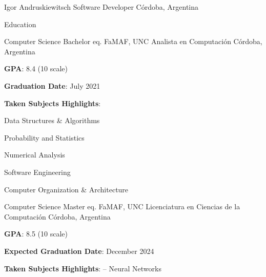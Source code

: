 \documentclass{curriculum}
\begin{document}

\begin{cvheader}

\makeheader
    {Igor Andruskiewitsch}  {}
    {Software Developer}    {}
    {Córdoba, Argentina}    {}

\end{cvheader}


\begin{cvsection}{Education}

    \makesectionitemheader
        {Computer Science Bachelor eq.}                             {FaMAF, UNC}
        {Analista en Computación}                           {Córdoba, Argentina}

        \begin{sectionitemlist}

        \item {
            \textbf{GPA}: 8.4 (10 scale)
        }
        \item {
            \textbf{Graduation Date}: July 2021
        }
        \item {
            \textbf{Taken Subjects Highlights}:
        }
        {
            \begin{colsectionitemlist}{3}
                \item{Data Structures \& Algorithms}
                \item{Probability and Statistics}
                \item{Numerical Analysis}
                \item{Software Engineering}
                \item{Computer Organization \& Architecture}
            \end{colsectionitemlist}
        }

        \end{sectionitemlist}

    \makesectionitemheader
        {Computer Science Master eq.}                               {FaMAF, UNC}
        {Licenciatura en Ciencias de la Computación}        {Córdoba, Argentina}

        \begin{sectionitemlist}

        \item {
            \textbf{GPA}: 8.5 (10 scale)
        }
        \item {
            \textbf{Expected Graduation Date}: December 2024
        }
        \item {
            \textbf{Taken Subjects Highlights}: – Neural Networks
        }

        \end{sectionitemlist}

\end{cvsection}
\end{document}

